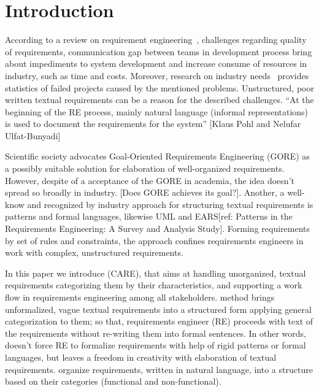 \section{Introduction}
\label{sec:intro} 


According to a review on requirement engineering~\cite{1Review}, challenges regarding quality of requirements, communication gap between teams in development process bring about impediments to system development and increase consume of resources in industry, such as time and costs. Moreover, research on industry needs~\cite{16NaPiRe} provides statistics of failed projects caused by the mentioned problems. Unstructured, poor written textual requirements can be a reason for the described challenges. 
``At the beginning of the RE process, mainly natural language (informal representations) is used to document the requirements for the system'' [Klaus Pohl and Nelufar Ulfat-Bunyadi]

Scientific society advocates Goal-Oriented Requirements Engineering (GORE) as a possibly suitable solution for elaboration of well-organized requirements. However, despite of a acceptance of the GORE in academia, the idea doesn't spread so broadly in industry. [Does GORE achieves its goal?]. Another, a well-know and recognized by industry approach for structuring textual requirements is patterns and formal languages, likewise UML and EARS[ref: Patterns in the Requirements Engineering: A Survey and Analysis Study]. Forming requirements by set of rules and constraints, the approach confines requirements engineers in work with complex, unstructured requirements.

In this paper we introduce \care (CARE), that aims at handling unorganized, textual requirements categorizing them by their characteristics, and supporting a work flow in requirements engineering among all stakeholders. \ca method brings unformalized, vague textual requirements into 
a structured form applying general categorization to them; so that, requirements engineer (RE) 
proceeds with text of the requirements without re-writing them into formal sentences. 
In other words, \ca doesn't force RE to formalize requirements with help of rigid patterns or 
formal languages, but leaves a freedom in creativity with elaboration of textual requirements. 
\ca organize requirements, written in natural language, into a structure based on their categories 
(functional and non-functional).

